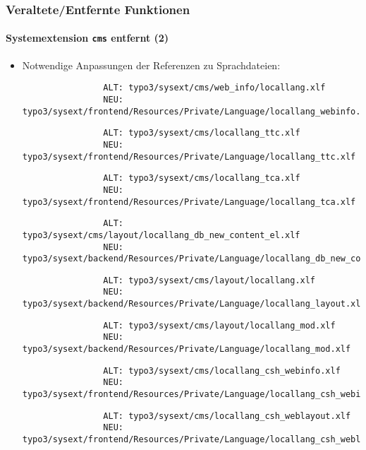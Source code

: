 \begin{frame}[fragile]
	\frametitle{Veraltete/Entfernte Funktionen}
	\framesubtitle{Systemextension \texttt{cms} entfernt (2)}

	\lstset{basicstyle=\tiny\ttfamily}

	\begin{itemize}

		\item Notwendige Anpassungen der Referenzen zu Sprachdateien:


			\begin{lstlisting}
				ALT: typo3/sysext/cms/web_info/locallang.xlf
				NEU: typo3/sysext/frontend/Resources/Private/Language/locallang_webinfo.xlf
			\end{lstlisting}
			\vspace{-0.3cm}
			\begin{lstlisting}
				ALT: typo3/sysext/cms/locallang_ttc.xlf
				NEU: typo3/sysext/frontend/Resources/Private/Language/locallang_ttc.xlf
			\end{lstlisting}
			\vspace{-0.3cm}
			\begin{lstlisting}
				ALT: typo3/sysext/cms/locallang_tca.xlf
				NEU: typo3/sysext/frontend/Resources/Private/Language/locallang_tca.xlf
			\end{lstlisting}
			\vspace{-0.3cm}
			\begin{lstlisting}
				ALT: typo3/sysext/cms/layout/locallang_db_new_content_el.xlf
				NEU: typo3/sysext/backend/Resources/Private/Language/locallang_db_new_content_el.xlf
			\end{lstlisting}
			\vspace{-0.3cm}
			\begin{lstlisting}
				ALT: typo3/sysext/cms/layout/locallang.xlf
				NEU: typo3/sysext/backend/Resources/Private/Language/locallang_layout.xlf
			\end{lstlisting}
			\vspace{-0.3cm}
			\begin{lstlisting}
				ALT: typo3/sysext/cms/layout/locallang_mod.xlf
				NEU: typo3/sysext/backend/Resources/Private/Language/locallang_mod.xlf
			\end{lstlisting}
			\vspace{-0.3cm}
			\begin{lstlisting}
				ALT: typo3/sysext/cms/locallang_csh_webinfo.xlf
				NEU: typo3/sysext/frontend/Resources/Private/Language/locallang_csh_webinfo.xlf
			\end{lstlisting}
			\vspace{-0.3cm}
			\begin{lstlisting}
				ALT: typo3/sysext/cms/locallang_csh_weblayout.xlf
				NEU: typo3/sysext/frontend/Resources/Private/Language/locallang_csh_weblayout.xlf
			\end{lstlisting}


\end{itemize}
\end{frame}

